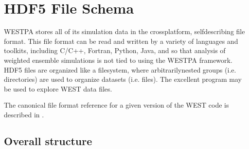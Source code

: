 \documentclass[letterpaper,10pt,english]{sphinxmanual}
\begin{document}
\section{HDF5 File Schema}
\label{\detokenize{users_guide/hdf5:hdf5-file-schema}}\label{\detokenize{users_guide/hdf5::doc}}
WESTPA stores all of its simulation data in the cross\sphinxhyphen{}platform, self\sphinxhyphen{}describing
 file format. This file format can be
read and written by a variety of languages and toolkits, including C/C++,
Fortran, Python, Java, and  so that analysis of
weighted ensemble simulations is not tied to using the WESTPA framework. HDF5
files are organized like a filesystem, where arbitrarily\sphinxhyphen{}nested groups (i.e.
directories) are used to organize datasets (i.e. files). The excellent  program may be used to
explore WEST data files.

The canonical file format reference for a given version of the WEST code is
described in .


\subsection{Overall structure}
\label{\detokenize{users_guide/hdf5:overall-structure}}
\begin{sphinxVerbatim}[commandchars=\\\{\}]
        \PYGZbs{}
\end{sphinxVerbatim}
\end{document}
